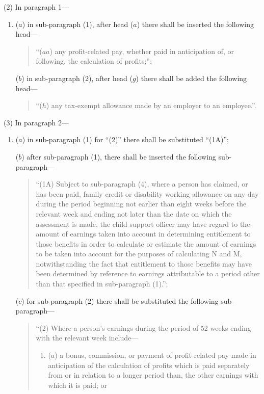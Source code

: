 \documentclass[a4paper]{article}
\begin{document}
(2) In paragraph 1—
\begin{enumerate}\item[]
($a$) in sub-paragraph (1), after head ($a$) there shall be inserted the following head—
\begin{quotation}
“($aa$) any profit-related pay, whether paid in anticipation of, or following, the calculation of profits;”;
\end{quotation}

($b$) in sub-paragraph (2), after head ($g$) there shall be added the following head—
\begin{quotation}
“($h$) any tax-exempt allowance made by an employer to an employee.”.
\end{quotation}
\end{enumerate}

(3) In paragraph 2—
\begin{enumerate}\item[]
($a$) in sub-paragraph (1) for “(2)” there shall be substituted “(1A)”;

($b$) after sub-paragraph (1), there shall be inserted the following sub-paragraph—
\begin{quotation}
“(1A) Subject to sub-paragraph (4), where a person has claimed, or has been paid, family credit or disability working allowance on any day during the period beginning not earlier than eight weeks before the relevant week and ending not later than the date on which the assessment is made, the child support officer may have regard to the amount of earnings taken into account in determining entitlement to those benefits in order to calculate or estimate the amount of earnings to be taken into account for the purposes of calculating N and M, notwithstanding the fact that entitlement to those benefits may have been determined by reference to earnings attributable to a period other than that specified in sub-paragraph (1).”;
\end{quotation}

($c$) for sub-paragraph (2) there shall be substituted the following sub-paragraph—
\begin{quotation}
“(2) Where a person’s earnings during the period of 52 weeks ending with the relevant week include—
\begin{enumerate}\item[]
($a$) a bonus, commission, or payment of profit-related pay made in anticipation of the calculation of profits which is paid separately from or in relation to a longer period than, the other earnings with which it is paid; or


\end{enumerate}
\end{quotation}
\end{enumerate}
\end{document}
